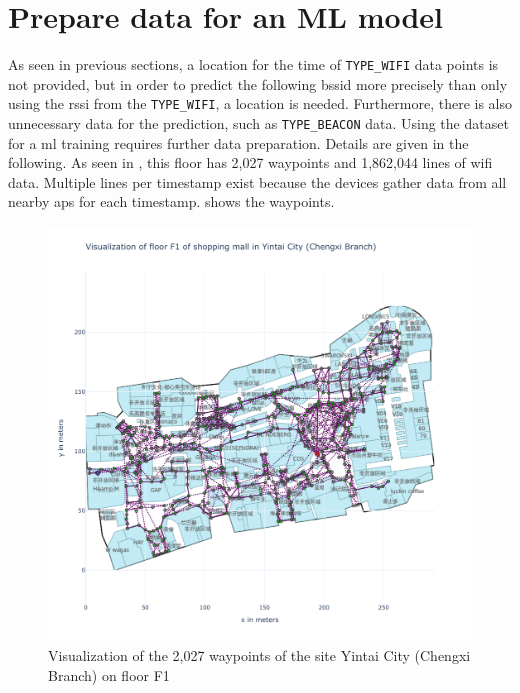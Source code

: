 \section{Prepare data for an ML model}\label{sec:prep-on-data-for-an-ml-model}

As seen in previous sections, a location for the time of \texttt{TYPE\_WIFI} data points is not provided, but in order to predict the following \ac{bssid} more precisely than only using the \ac{rssi} from the \texttt{TYPE\_WIFI}, a location is needed.
Furthermore, there is also unnecessary data for the prediction, such as \texttt{TYPE\_BEACON} data.
Using the dataset for a \ac{ml} training requires further data preparation.
Details are given in the following.
As seen in , this floor has 2,027 waypoints and 1,862,044 lines of \ac{wifi} data. Multiple lines per timestamp exist because the devices gather data from all nearby \acp{ap} for each timestamp.
 shows the waypoints.

\begin{figure}[h!]
    \centering
    \includegraphics[scale=0.6]{images/whole_floor_visualization_wo_interpolated.pdf}
    \caption{Visualization of the 2,027 waypoints of the site Yintai City (Chengxi Branch) on floor F1}
    \label{fig:vis-wo-interpolated}
\end{figure}

